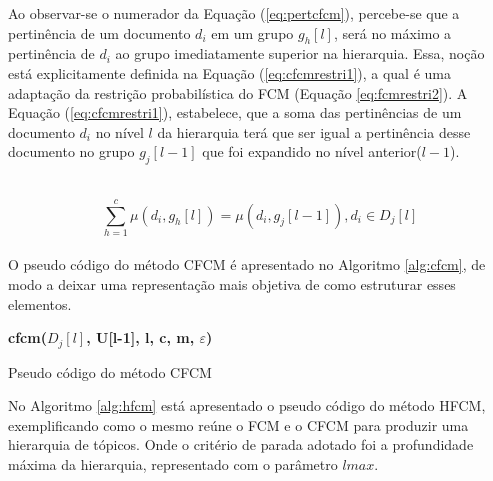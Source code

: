 Ao observar-se o numerador da Equação (\ref{eq:pertcfcm}), percebe-se que a pertinência
de um documento $d_i$ em um grupo $g_h[l]$, será no máximo a pertinência de $d_i$ ao grupo
imediatamente superior na hierarquia. Essa, noção está explicitamente definida na Equação
(\ref{eq:cfcmrestri1}), a qual é uma adaptação da restrição probabilística do FCM (Equação
\ref{eq:fcmrestri2}). A Equação (\ref{eq:cfcmrestri1}), estabelece, que a soma das pertinências de
um documento $d_i$ no nível $l$ da hierarquia terá que ser igual a pertinência desse documento no
grupo $g_j[l-1]$ que foi expandido no nível anterior($l-1$).

\leavevmode\\
\begin{equation}
  \sum_{h=1}^c \mu(d_i,g_h[l]) = \mu(d_i,g_j[l-1]), d_i \in D_j[l]
  \label{eq:cfcmrestri1}
\end{equation}
\leavevmode\\

O pseudo código do método CFCM é apresentado no Algoritmo \ref{alg:cfcm}, de modo a deixar uma
representação mais objetiva de como estruturar esses elementos. 

\begin{algorithm}[!htp] 
  \SetAlgoLined 
  \textbf{{\color{blue}cfcm}($D_j[l]$, U[l-1], l, c, m, $\varepsilon$)}\\
  \caption{Pseudo código do método CFCM}
  \label{alg:cfcm} 
\end{algorithm}

No Algoritmo \ref{alg:hfcm} está apresentado o pseudo código do método HFCM, exemplificando como o
mesmo reúne o FCM e o CFCM para produzir uma hierarquia de tópicos. Onde o critério de parada
adotado foi a profundidade máxima da hierarquia, representado com o parâmetro $lmax$.

